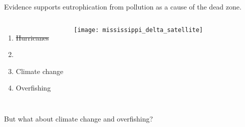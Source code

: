\documentclass[t]{beamer}
\begin{document}
\begin{frame}{Evidence supports eutrophication from pollution as a cause of the dead zone.}

	\begin{columns}[t]
			\begin{enumerate}
				\item \sout{Hurricanes} %
				\item {}
				\item Climate change
				\item Overfishing
			\end{enumerate}
			

			\texttt{[image: mississippi\_delta\_satellite]}

	\end{columns}
	
	
	\hangpara But what about climate change and overfishing?
	
\end{frame}
%
\end{document}

